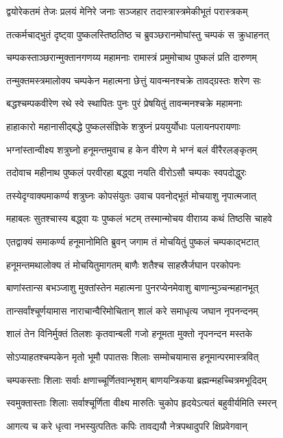 \twolineshloka
{द्वयोरेकतमं तेजः प्रलयं मेनिरे जनाः}
{सञ्जहार तदास्त्रास्त्रमेकीभूतं परास्त्रकम्}%

\twolineshloka
{तत्कर्मचाद्भुतं दृष्ट्वा पुष्कलस्तिष्ठतिष्ठ च}
{ब्रुवञ्छरानमोघांस्तु चम्पकं स क्रुधाहनत्}%

\twolineshloka
{चम्पकस्ताञ्छरान्मुक्तानगणय्य महामनाः}
{रामास्त्रं प्रमुमोचाथ पुष्कलं प्रति दारुणम्}%

\twolineshloka
{तन्मुक्तमस्त्रमालोक्य चम्पकेन महात्मना}
{छेत्तुं यावन्मनश्चक्रे तावद्ग्रस्तः शरेण सः}%

\twolineshloka
{बद्धश्चम्पकवीरेण रथे स्वे स्थापितः पुनः}
{पुरं प्रेषयितुं तावन्मनश्चक्रे महामनाः}%

\twolineshloka
{हाहाकारो महानासीद्बद्धे पुष्कलसंज्ञिके}
{शत्रुघ्नं प्रययुर्योधाः पलायनपरायणाः}%

\twolineshloka
{भग्नांस्तान्वीक्ष्य शत्रुघ्नो हनूमन्तमुवाच ह}
{केन वीरेण मे भग्नं बलं वीरैरलङ्कृतम्}%

\twolineshloka
{तदोवाच महीनाथ पुष्कलं परवीरहा}
{बद्ध्वा नयति वीरोऽसौ चम्पकः स्वपदोद्धुरः}%

\twolineshloka
{तस्येदृग्वाक्यमाकर्ण्य शत्रुघ्नः कोपसंयुतः}
{उवाच पवनोद्भूतं मोचयाशु नृपात्मजात्}%

\twolineshloka
{महाबलः सुतश्चास्य बद्ध्वा यः पुष्कलं भटम्}
{तस्मान्मोचय वीराग्र्य कथं तिष्ठसि चाहवे}%

\twolineshloka
{एतद्वाक्यं समाकर्ण्य हनूमानोमिति ब्रुवन्}
{जगाम तं मोचयितुं पुष्कलं चम्पकाद्भटात्}%

\twolineshloka
{हनूमन्तमथालोक्य तं मोचयितुमागतम्}
{बाणैः शतैश्च साहस्रैर्जघान परकोपनः}%

\twolineshloka
{बाणांस्तान्स बभञ्जाशु मुक्तांस्तेन महात्मना}
{पुनरप्येनमेवाशु बाणान्मुञ्चन्महानभूत्}%

\twolineshloka
{तान्सर्वांश्चूर्णयामास नाराचान्वैरिमोचितान्}
{शालं करे समाधृत्य जघान नृपनन्दनम्}%

\twolineshloka
{शालं तेन विनिर्मुक्तं तिलशः कृतवान्बली}
{गजो हनूमता मुक्तो नृपनन्दन मस्तके}%

\twolineshloka
{सोऽप्याहतश्चम्पकेन मृतो भूमौ पपातसः}
{शिलाः सम्मोचयामास हनूमान्परमास्त्रवित्}%

\twolineshloka
{चम्पकस्ताः शिलाः सर्वाः क्षणाच्चूर्णितवान्भृशम्}
{बाणयन्त्रिकया ब्रह्मन्महच्चित्रमभूदिदम्}%

\twolineshloka
{स्वमुक्तास्ताः शिलाः सर्वाश्चूर्णिता वीक्ष्य मारुतिः}
{चुकोप हृदयेऽत्यतं बहुवीर्यमिति स्मरन्}%

\twolineshloka
{आगत्य च करे धृत्वा नभस्युत्पतितः कपिः}
{तावद्ययौ नेत्रपथादुपरि क्षिप्रवेगवान्}%

